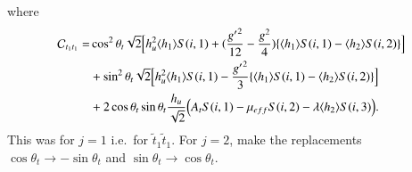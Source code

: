 \documentclass[final,3p,times]{elsarticle}
\begin{document}
where
\begin{equation}
\begin{aligned}
\mathcal{C}_{t_{1}t_{1}} = & \cos^2\theta_t \sqrt{2}\Big[h_{u}^2 \langle h_{1} \rangle S(i,1) + ({{g'}^{2} \over 12} - {g^2 \over 4})\{\langle h_{1} \rangle S(i,1) - \langle h_{2} \rangle S(i,2)\}\Big] \\ & + \sin^2 \theta_t \sqrt{2} \Big[h_{u}^2 \langle h_{1} \rangle S(i,1) - {{g'}^2 \over 3}\{\langle h_{1} \rangle S(i,1) - \langle h_{2} \rangle S(i,2)\}\Big] \\ & + 2\cos\theta_t \sin\theta_t {h_{u} \over \sqrt{2}}\Big(A_t S(i,1) - \mu_{eff} S(i,2) - \lambda \langle h_{2} \rangle S(i,3)\Big).
\end{aligned}
\end{equation}
This was for $j=1$ i.e.\ for $\tilde{t}_1 \tilde{t}_1$. For $j = 2$, make the replacements $\cos\theta_t \rightarrow -\sin\theta_t$ and $\sin\theta_t \rightarrow \cos\theta_t$.
\end{document}
